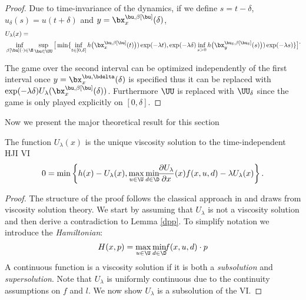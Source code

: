 \begin{for_journal}
\begin{proof}
Due to time-invariance of the dynamics, if we define $s=t-\delta$, $u_\delta(s)=u(t+\delta)$ and $y=\bx_{x}^{\bu,\beta[\bu]}(\delta)$,
\begin{equation}
\begin{split}{}{}{}
&U_{\lambda}(x) =\\ 
&\inf_{\beta[\bu](\cdot) \in \B} \sup_{\bu \in \UU} 
\big [\min\{\inf_{t \in [0, \delta]} h\big(\bx_{x}^{\bu,\beta[\bu]}(t)\big))\exp(-\lambda  t),\exp(-\lambda \delta) \inf_{s > 0} h\big(\bx_{y}^{\bu_\delta,\beta[\bu_\delta]}(s)\big))\exp(-\lambda s)\}
\big ]
\end{split}.
\end{equation}

The game over the second interval can be optimized independently of the first interval once $y=\bx_{x}^{\bu,\bdelta}(\delta)$ is specified thus it can be replaced with $\exp(-\lambda \delta)U_{\lambda}(\bx_{x}^{\bu,\beta[\bu]}(\delta))$. Furthermore $\UU$ is replaced with $\UU_\delta$ since the game is only played explicitly on $[0,\delta]$.
\end{proof}

Now we present the major theoretical result for this section

\begin{proposition}
The function $U_{\lambda}(x)$ is the unique viscosity solution to the time-independent HJI VI
\begin{equation}\label{eq:HJI_lambda}
    0 = \min\left\{h(x)-U_{\lambda}(x), \max_{u\in\U} \min_{ d\in\D} \!\!\frac{\partial U_{\lambda}}{\partial x}(x) f(x,u, d) - \lambda U_{\lambda}(x)\right\}.
\end{equation}
\end{proposition}

\begin{proof}
The structure of the proof follows the classical approach in \cite{Evans1984} and draws from viscosity solution theory. We start by assuming that $U_{\lambda}$ is not a viscosity solution and then derive a contradiction to Lemma \ref{dpp}. To simplify notation we introduce the \emph{Hamiltonian}:
\begin{equation}
H(x,p) = \max_{u\in\U} \min_{ d\in\D} \!\! f(x,u,d)\cdot p
\end{equation}
A continuous function is a viscosity solution if it is both a \emph{subsolution} and \emph{supersolution}. Note that $U_{\lambda}$ is uniformly continuous due to the continuity assumptions on $f$ and $l$. We now show $U_{\lambda}$ is a subsolution of the VI.


\end{proof}
\end{for_journal}
